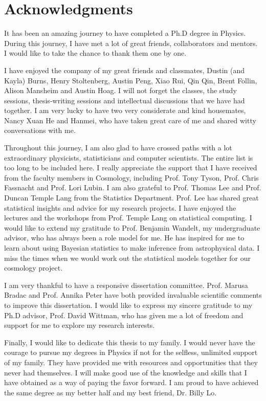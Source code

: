 \section*{Acknowledgments} 

It has been an amazing journey to have completed a Ph.D degree in Physics. 
During this journey, I have met a lot of great friends, collaborators and
mentors. I would like to take the chance to thank them one by one.  

I have enjoyed the company of my great friends and classmates, Dustin (and Kayla) 
Burns, Henry Stoltenberg, Austin Peng, Xiao Rui, Qin Qin, 
Brent Follin, Alison Mansheim and 
Austin Hoag. I will not forget the
classes, the study sessions, thesis-writing sessions and 
intellectual discussions that we have had together.
I am very lucky to have two very considerate and kind housemates, Nancy Xuan He
and Hanmei, who have taken great care of me and shared witty conversations with
me.  
 
Throughout this journey, I am also glad to have crossed paths with a lot 
extraordinary physicists, statisticians and computer scientists. 
The entire list is too long to be included here. 
I really appreciate the support that I have received from the
faculty members in Cosmology, including Prof. Tony Tyson, 
Prof. Chris Fassnacht and Prof. Lori Lubin. 
 I am also grateful to Prof. Thomas Lee and Prof. Duncan Temple Lang from the
Statistics Department. Prof. Lee has shared great statistical insights and 
advice for my research projects. I have enjoyed the lectures and the workshops 
from Prof. Temple Lang on statistical computing.  
I would like to extend my gratitude to Prof. Benjamin Wandelt,  
my undergraduate advisor, who has always been a role model for me. 
He has inspired for me to learn about using Bayesian statistics 
to make inference from astrophysical data. I miss the times when we would work
out the statistical models together for our cosmology project. 
 
I am very thankful to have a responsive dissertation committee.
Prof. Marusa Bradac and Prof. Annika Peter have both provided 
invaluable scientific comments to improve this dissertation.  
I would like to express my sincere gratitude to my Ph.D advisor,
Prof. David Wittman, who has given me a lot of freedom and support for 
me to explore my research interests. 

Finally, I would like to dedicate this thesis to my family.
I would never have the courage to pursue my degrees in Physics if not for the
selfless, unlimited support of my family.  
They have provided me with resources and opportunities that they never had
themselves. 
I will make good use of the knowledge and skills that I have obtained as a way
of paying the favor forward. I am proud to have achieved the same degree as my 
better half and my best friend, Dr. Billy Lo. 
